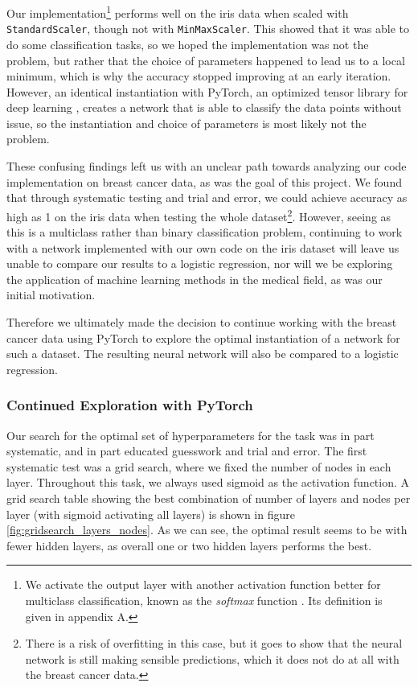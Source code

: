 Our implementation\footnote{We activate the output layer with another activation function better for multiclass classification, known as the \emph{softmax} function \cite{softmax}. Its definition is given in appendix A.} performs well on the iris data when scaled with \texttt{StandardScaler}, though not with \texttt{MinMaxScaler}. This showed that it was able to do some classification tasks, so we hoped the implementation was not the problem, but rather that the choice of parameters happened to lead us to a local minimum, which is why the accuracy stopped improving at an early iteration. However, an identical instantiation with PyTorch, an optimized tensor library for deep learning \cite{pytorch}, creates a network that is able to classify the data points without issue, so the instantiation and choice of parameters is most likely not the problem.

These confusing findings left us with an unclear path towards analyzing our code implementation on breast cancer data, as was the goal of this project. We found that through systematic testing and trial and error, we could achieve accuracy as high as 1 on the iris data when testing the whole dataset\footnote{There is a risk of overfitting in this case, but it goes to show that the neural network is still making sensible predictions, which it does not do at all with the breast cancer data.}. However, seeing as this is a multiclass rather than binary classification problem, continuing to work with a network implemented with our own code on the iris dataset will leave us unable to compare our results to a logistic regression, nor will we be exploring the application of machine learning methods in the medical field, as was our initial motivation.

Therefore we ultimately made the decision to continue working with the breast cancer data using PyTorch to explore the optimal instantiation of a network for such a dataset. The resulting neural network will also be compared to a logistic regression. 

\subsubsection{Continued Exploration with PyTorch}
Our search for the optimal set of hyperparameters for the task was in part systematic, and in part educated guesswork and trial and error. The first systematic test was a grid search, where we fixed the number of nodes in each layer. Throughout this task, we always used sigmoid as the activation function. A grid search table showing the best combination of number of layers and nodes per layer (with sigmoid activating all layers) is shown in figure \ref{fig:gridsearch_layers_nodes}. As we can see, the optimal result seems to be with fewer hidden layers, as overall one or two hidden layers performs the best. 

